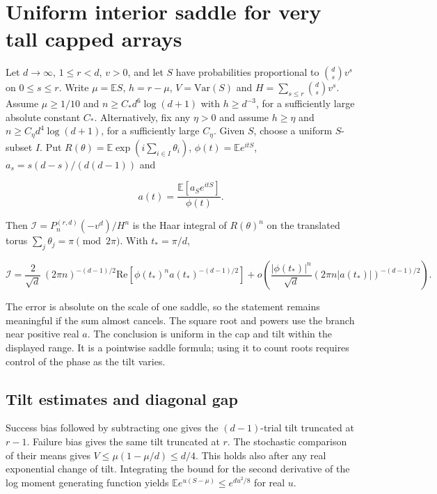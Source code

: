 \section{Uniform interior saddle for very tall capped arrays}\label{sec:interior-saddle}

Let $d\to\infty$, $1\le r<d$, $v>0$, and let $S$ have probabilities proportional to $\binom ds v^s$ on $0\le s\le r$. Write $\mu=\mathbb ES$, $h=r-\mu$, $V=\mathrm{Var}(S)$ and $H=\sum_{s\le r}\binom ds v^s$. Assume $\mu\ge 1/10$ and $n\ge C_* d^6\log(d+1)$ with $h\ge d^{-3}$, for a sufficiently large absolute constant $C_*$. Alternatively, fix any $\eta>0$ and assume $h\ge\eta$ and $n\ge C_\eta d^4\log(d+1)$, for a sufficiently large $C_\eta$. Given $S$, choose a uniform $S$-subset $I$. Put $R(\theta)=\mathbb E\exp(i\sum_{i\in I}\theta_i)$, $\phi(t)=\mathbb E e^{itS}$, $a_s=s(d-s)/(d(d-1))$ and

\begin{equation*}
a(t)=\frac{\mathbb E[a_S e^{itS}]}{\phi(t)}.
\end{equation*}

Then $\mathcal I=P_n^{(r,d)}(-v^d)/H^n$ is the Haar integral of $R(\theta)^n$ on the translated torus $\sum_j\theta_j=\pi\pmod{2\pi}$. With $t_*=\pi/d$,

\begin{equation*}
\mathcal I=\frac{2}{\sqrt d}\,(2\pi n)^{-(d-1)/2}
   \mathrm{Re}\!\left[\phi(t_*)^n a(t_*)^{-(d-1)/2}\right]
   +o\!\left(\frac{|\phi(t_*)|^n}{\sqrt d}(2\pi n|a(t_*)|)^{-(d-1)/2}\right).
\end{equation*}

The error is absolute on the scale of one saddle, so the statement remains meaningful if the sum almost cancels. The square root and powers use the branch near positive real $a$. The conclusion is uniform in the cap and tilt within the displayed range. It is a pointwise saddle formula; using it to count roots requires control of the phase as the tilt varies.

\subsection{Tilt estimates and diagonal gap}

Success bias followed by subtracting one gives the $(d-1)$-trial tilt truncated at $r-1$. Failure bias gives the same tilt truncated at $r$. The stochastic comparison of their means gives $V\le\mu(1-\mu/d)\le d/4$. This holds also after any real exponential change of tilt. Integrating the bound for the second derivative of the log moment generating function yields $\mathbb E e^{u(S-\mu)}\le e^{du^2/8}$ for real $u$.

